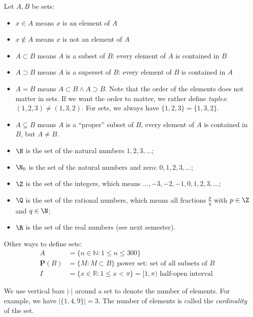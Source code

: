 \begin{notation}
Let $A,B$ be sets:
\begin{itemize}
 \item $x \in A$ means $x$ is an element of $A$
 \item $x\not\in A$ means $x$ is not an element of $A$
 \item $A \subset B$ means $A$ is a subset of $B$: every element of $A$ is contained in $B$
 \item $A \supset B$ means $A$ is a superset of $B$: every element of $B$ is contained in $A$
 \item $A=B$ means $A \subset B \wedge A \supset B$. 
 Note that the order of the elements does not matter in sets.
 If we want the order to matter, we rather define \emph{tuples}:
$(1,2,3) \neq (1,3,2)$. For sets, we always have $\{ 1,2,3 \} = \{1, 3,2\}$.
 \item $A \subsetneq B$ means $A$ is a ``proper'' subset of $B$, every element of $A$ is contained in $B$, but $A \neq B$. 
 \end{itemize}
\end{notation}

\begin{Boxx}
\begin{itemize}\itemsep0mm
\item $\N$ is the set of the natural numbers $1,2,3,\ldots$; 
\item $\N_0$ is the set of the natural numbers and zero: $0, 1, 2, 3,\dots$;
\item $\Z$ is the set of the integers, which means  $\ldots,-3,-2,-1,0,1,2,3,\ldots$;
\item $\Q$ is the set of the rational numbers, which means 
all fractions $\frac pq$ with $p\in\Z$ and $q\in\N$;
\item $\R$ is the set of the real numbers (see next semester).
\end{itemize}
\end{Boxx}

Other ways to define sets:
\begin{align*}
 A &= \{ n \in \mathbb{N} : 1 \le n \le 300 \}\\
 \mathbf{P}(B) &= \{ M : M \subset B \} \mbox{ power set: set of all subsets of } B\\
 I &= \{ x\in \mathbb{R} : 1 \le x < \pi \} = [1,\pi) \mbox{ half-open interval }
\end{align*}
%

\begin{Definition}[Cardinality]
We use vertical bars $|\cdot|$ around a set
to denote the number of elements.
For example, we have $|\{1,4,9\}|=3$. The number of elements is called the \emph{cardinality} of the set. 
\end{Definition}

